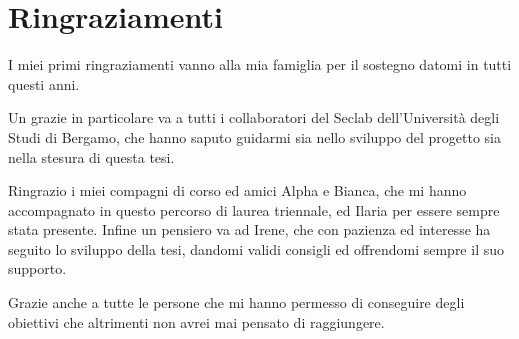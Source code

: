 \documentclass[a4paper,12pt,twoside,openright]{report}
\begin{document}
  \nocite{*}
  \printbibliography[heading=bibintoc]
  \thispagestyle{fancy}


  \chapter*{Ringraziamenti}
  \thispagestyle{fancy}

  I miei primi ringraziamenti vanno alla mia famiglia per il sostegno datomi in tutti questi anni.

  Un grazie in particolare va a tutti i collaboratori del Seclab dell'Università degli Studi di Bergamo, che
  hanno saputo guidarmi sia nello sviluppo del progetto sia nella stesura di questa tesi.

  Ringrazio i miei compagni di corso ed amici Alpha e Bianca, che mi hanno accompagnato in questo percorso di
  laurea triennale, ed Ilaria per essere sempre stata presente.
  Infine un pensiero va ad Irene, che con pazienza ed interesse ha seguito lo sviluppo della tesi,
  dandomi validi consigli ed offrendomi sempre il suo supporto.

  Grazie anche a tutte le persone che mi hanno permesso di conseguire degli obiettivi
  che altrimenti non avrei mai pensato di raggiungere.
\end{document}
